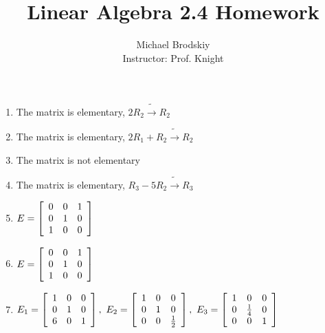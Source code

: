 \documentclass[12pt]{article}
\title{Linear Algebra 2.4 Homework}
\date{}
\author{Michael Brodskiy\\ \small Instructor: Prof. Knight}
\begin{document}
\maketitle

\begin{enumerate}

  \item The matrix is elementary, $2R_2\widetilde{\rightarrow}R_2$

    \setcounter{enumi}{2}

  \item The matrix is elementary, $2R_1+R_2\widetilde{\rightarrow}R_2$

    \setcounter{enumi}{4}

  \item The matrix is not elementary 

    \setcounter{enumi}{6}

  \item The matrix is elementary, $R_3-5R_2\widetilde{\rightarrow}R_3$

    \setcounter{enumi}{8}

  \item $E=\left[ \begin{array}{c c c} 0 & 0 & 1\\ 0 & 1 & 0\\ 1 & 0 & 0 \end{array} \right]$

    \setcounter{enumi}{10}

  \item $E=\left[ \begin{array}{c c c} 0 & 0 & 1\\ 0 & 1 & 0\\ 1 & 0 & 0 \end{array} \right]$

    \setcounter{enumi}{14}

  \item $E_1=\left[ \begin{array}{c c c} 1 & 0 & 0 \\ 0 & 1 & 0\\ 6 & 0 & 1 \end{array} \right],\text{ }E_2=\left[ \begin{array}{c c c} 1 & 0 & 0 \\ 0 & 1 & 0\\ 0 & 0 & \frac{1}{2} \end{array} \right],\text{ }E_3=\left[ \begin{array}{c c c} 1 & 0 & 0 \\ 0 & \frac{1}{4} & 0\\ 0 & 0 & 1 \end{array} \right]$


\end{enumerate}
\end{document}
